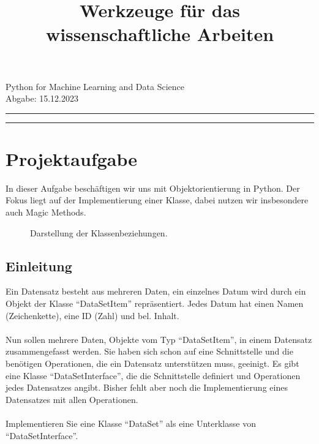 \documentclass[]{article}
\begin{document}
\title{\textbf{Werkzeuge für das wissenschaftliche Arbeiten}}
\date{}
\maketitle
\vspace{-2cm}
\begin{center}
    Python for Machine Learning and Data Science \\
    Abgabe: 15.12.2023
\end{center}
\vspace{0.2cm}
\hrule
\vspace{0.3cm}

\tableofcontents

\vspace{0.5cm}
\hrule

\section{Projektaufgabe}
    In dieser Aufgabe beschäftigen wir uns mit Objektorientierung in Python.
    Der Fokus liegt auf der Implementierung einer Klasse, dabei nutzen wir insbesondere auch Magic Methods.
    \vspace{0.5cm}
    \begin{figure}[ht]
        \centering
        
        \caption{Darstellung der Klassenbeziehungen.}
    \end{figure}

    \subsection{Einleitung} 
        Ein Datensatz besteht aus mehreren Daten, ein einzelnes Datum wird durch ein Objekt der Klasse ``DataSetItem'' repräsentiert.
        Jedes Datum hat einen Namen (Zeichenkette), eine ID (Zahl) und bel. Inhalt.\\
        \\
        Nun sollen mehrere Daten, Objekte vom Typ ``DataSetItem'', in einem Datensatz zusammengefasst werden.
        Sie haben sich schon auf eine Schnittstelle und die benötigen Operationen, die ein Datensatz unterstützen muss, geeinigt.
        Es gibt eine Klasse ``DataSetInterface'', die die Schnittstelle definiert und Operationen jedes Datensatzes angibt.
        Bisher fehlt aber noch die Implementierung eines Datensatzes mit allen Operationen.\\
        \\
        Implementieren Sie eine Klasse ``DataSet'' als eine Unterklasse von ``DataSetInterface''.\\
\end{document}
